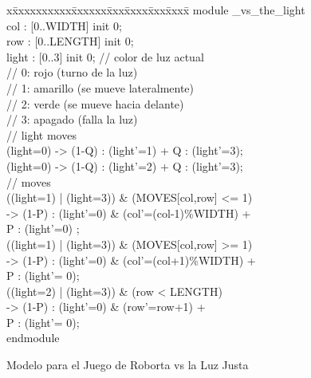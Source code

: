 \begin{figure}[t]
\centering
\begin{minipage}[t]{.47\textwidth}
{\fontsize{7.6}{7.6}\selectfont\ttfamily
\begin{tabbing}
x\=xxxxxxxxxx\=xxxxxx\=xxx\=xxxx\=xxx\=xxxx\= \kill    
module \roborta\_vs\_the\_light\\[1ex]
\>col : [0..WIDTH] init 0; \\
\>row : [0..LENGTH] init 0; \\
\>light : [0..3] init 0; \>\>\>\> // color de luz actual \\%
\>                   \>\>\>\>// 0: rojo (turno de la luz) \\%
\>                   \>\>\>\>// 1: amarillo (\roborta se mueve lateralmente) \\%
\>                   \>\>\>\>// 2: verde (\roborta se mueve hacia delante) \\%
\>                   \>\>\>\>// 3: apagado (falla la luz) \\[1ex]
\> // light moves \\[1ex]
\>[l\_y] (light=0) \> \>-> \>(1-Q) : (light'=1) + Q : (light'=3);\\[1ex]
\>[l\_g] (light=0) \> \>-> \>(1-Q) : (light'=2) + Q : (light'=3);\\[1ex]
\> // \roborta moves \\[1ex]
\>[r\_l]  ((light=1) | (light=3)) \& (MOVES[col,row] <= 1)  \\
\>                    \>\>-> \>(1-P) : (light'=0) \& (col'=(col-1)\%WIDTH) + \\       
\>                     \>\>\>  P : (light'=0) ; \\[1ex]

\>[r\_r] ((light=1) | (light=3)) \& (MOVES[col,row] >= 1)\\
\>                    \>\>-> \> (1-P) : (light'=0) \& (col'=(col+1)\%WIDTH) + \\
\>                     \>\>\> P : (light'= 0); \\[1ex]
\>[r\_f] ((light=2) | (light=3)) \& (row < LENGTH) \\
\>                    \>\>-> \> (1-P) : (light'=0) \& (row'=row+1)  + \\
\>                     \>\>\> P : (light'= 0);\\[1ex]
endmodule\\[-5ex]
\end{tabbing}}
\end{minipage}
\vspace{0.5cm}
\caption{Modelo para el Juego de Roborta vs la Luz Justa} \label{fig:robot_game_model}
\end{figure}

